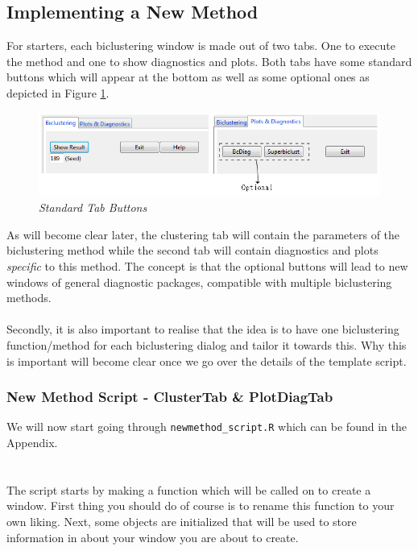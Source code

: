 \documentclass[a4paper]{article}\usepackage[]{graphicx}\usepackage[]{color}
\begin{document}
\subsection{Implementing a New Method}

\noindent For starters, each biclustering window is made out of two tabs.
One to execute the method and one to show diagnostics and plots. Both tabs have
some standard buttons which will appear at the bottom as well as some optional
ones as depicted in Figure \ref{stdbuttons}.
\begin{figure}[H]
\centering
\includegraphics[scale=0.5]{figures/standard_buttons.png}
\caption{{\it Standard Tab Buttons}\label{stdbuttons}}
\end{figure}
\noindent As will become clear later, the clustering tab will
contain the parameters of the biclustering method while the second tab will
contain diagnostics and plots {\it specific} to this method. The concept is that
the optional buttons will lead to new windows of general diagnostic packages,
compatible with multiple biclustering methods.
\\ \\
\noindent Secondly, it is also important to realise that the idea is to have one
biclustering function/method for each biclustering dialog and tailor it towards
this. Why this is important will become clear once we go over the details of the
template script. 


\subsubsection{New Method Script - ClusterTab \& PlotDiagTab}
We will now start going through \verb|newmethod_script.R| which can be found in
the Appendix.
\\ \\
\\
\noindent The script starts by making a function which will be called on to
create a window. First thing you should do of course is to rename this function
to your own liking. Next, some objects are initialized that will be used to
store information in about your window you are about to create.
\end{document}
